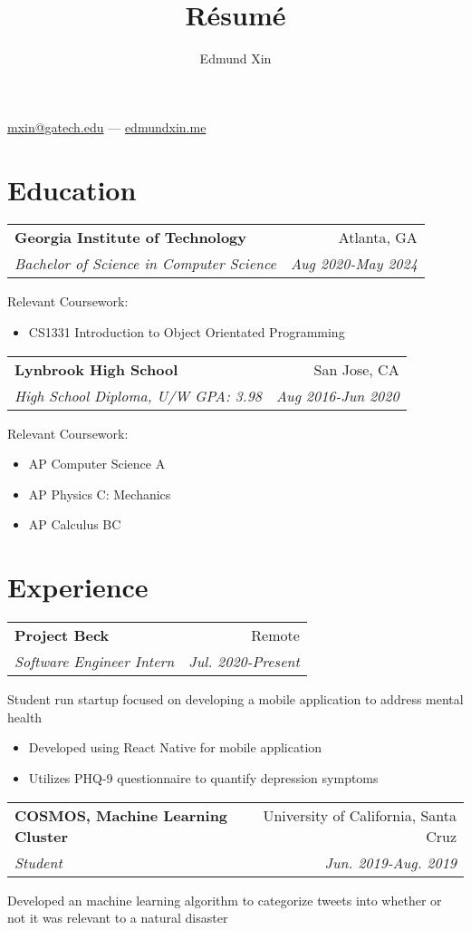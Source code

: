\documentclass[letterpaper,8pt]{article}
\makeatletter
\renewcommand{\maketitle}{
  \begin{center}
  {\huge\bfseries
  \theauthor}

  \vspace{0.25em}

  \href{mailto:mxin@gatech.edu}{mxin@gatech.edu} --- \href{https://edmundxin.me}{edmundxin.me}

  \end{center}
}
\newcommand{\resumeSubheading}[4]{
  \vspace{0.25em}
  \begin{tabular*}{0.97\textwidth}[t]{l@{\extracolsep{\fill}}r}
    \textbf{#1} & #2 \\
    \textit{#3} & \textit{#4} \\
  \end{tabular*}\vspace{0.25em}
}
\makeatother
\begin{document}
\title{R\'esum\'e}
\author{Edmund Xin}

\maketitle

\section{Education}

\resumeSubheading{Georgia Institute of Technology}
{Atlanta, GA}{Bachelor of Science in Computer Science
}{Aug 2020-May 2024}
Relevant Coursework:
\begin{itemize}[label=\raisebox{0.25ex}{\tiny$\bullet$}, font=\small]
  \item CS1331 Introduction to Object Orientated Programming
\end{itemize}


\resumeSubheading{Lynbrook High School}
{San Jose, CA}{High School Diploma, U/W GPA: 3.98}{Aug 2016-Jun 2020}
Relevant Coursework:
\begin{itemize}[label=\raisebox{0.25ex}{\tiny$\bullet$}]
  \item AP Computer Science A
  \item AP Physics C: Mechanics
  \item AP Calculus BC
\end{itemize}


\section{Experience}

\resumeSubheading{Project Beck}{Remote}{Software Engineer Intern}{Jul. 2020-Present}

Student run startup focused on developing a mobile application to address mental health

\begin{itemize}[label=\raisebox{0.25ex}{\tiny$\bullet$}]
  \item Developed using React Native for mobile application
  \item Utilizes PHQ-9 questionnaire to quantify depression symptoms
\end{itemize}

\resumeSubheading{COSMOS, Machine Learning Cluster}
{University of California, Santa Cruz}{Student}{Jun. 2019-Aug. 2019}

Developed an machine learning algorithm to categorize tweets into whether or not it was relevant to a natural disaster
\end{document}
